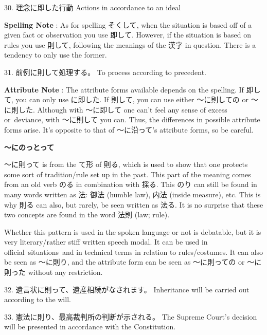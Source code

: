 \par{30. 理念に即した行動 \hfill\break
Actions in accordance to an ideal }
 
\par{\textbf{Spelling Note }: As for spelling そくして, when the situation is based off of a given fact or observation you use 即して. However, if the situation is based on rules you use 則して, following the meanings of the 漢字 in question. There is a tendency to only use the former. }

\par{31. 前例に則して処理する。 \hfill\break
To process according to precedent. }

\par{\textbf{Attribute Note }: The attribute forms available depends on the spelling. If 即して, you can only use に即した. If 則して, you can use either ～に則しての or ～に則した. Although with ～に即して one can't feel any sense of excess or deviance, with ～に則して you can. Thus, the differences in possible attribute forms arise. It's opposite to that of ～に沿って's attribute forms, so be careful. }

\begin{center}
 \textbf{～にのっとって }
\end{center}

\par{ ～に則って is from the て形 of 則る, which is used to show that one protects some sort of tradition\slash rule set up in the past. This part of the meaning comes from an old verb のる in combination with 採る. This のり can still be found in many words written as 法: 御法 (humble law), 内法 (inside measure), etc. This is why 則る can also, but rarely, be seen written as 法る. It is no surprise that these two concepts are found in the word 法則 (law; rule). }

\par{ Whether this pattern is used in the spoken language or not is debatable, but it is very literary\slash rather stiff written speech modal. It can be used in official situations and in technical terms in relation to rules\slash costumes. It can also be seen as ～に則り, and the attribute form can be seen as ～に則っての or ～に則った without any restriction. }

\par{32. 遺言状に則って、遺産相続がなされます。 \hfill\break
Inheritance will be carried out according to the will. }

\par{33. 憲法に則り、最高裁判所の判断が示される。 \hfill\break
The Supreme Court's decision will be presented in accordance with the Constitution. }


